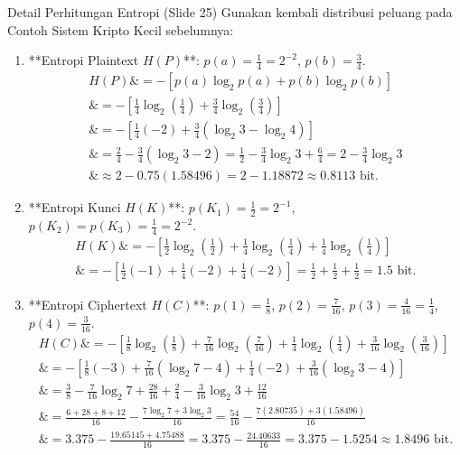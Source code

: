 \documentclass[11pt,a4paper]{article}
\begin{document}
\begin{examplebox}{Detail Perhitungan Entropi (Slide 25)}
Gunakan kembali distribusi peluang pada Contoh Sistem Kripto Kecil sebelumnya:
\begin{enumerate}
    \item **Entropi Plaintext $H(P)$**:
    $p(a) = \frac{1}{4} = 2^{-2}$, $p(b) = \frac{3}{4}$.
    \begin{align*}
    H(P) \&= - \left[ p(a)\log_2 p(a) + p(b)\log_2 p(b) \right] \\
    \&= - \left[ \frac{1}{4}\log_2\left(\frac{1}{4}\right) + \frac{3}{4}\log_2\left(\frac{3}{4}\right) \right] \\
    \&= - \left[ \frac{1}{4}(-2) + \frac{3}{4}(\log_2 3 - \log_2 4) \right] \\
    \&= \frac{2}{4} - \frac{3}{4}(\log_2 3 - 2) = \frac{1}{2} - \frac{3}{4}\log_2 3 + \frac{6}{4} = 2 - \frac{3}{4}\log_2 3 \\
    \&\approx 2 - 0.75(1.58496) = 2 - 1.18872 \approx 0.8113 \text{ bit}.
    \end{align*}
    \item **Entropi Kunci $H(K)$**:
    $p(K_1) = \frac{1}{2} = 2^{-1}$, $p(K_2) = p(K_3) = \frac{1}{4} = 2^{-2}$.
    \begin{align*}
    H(K) \&= - \left[ \frac{1}{2}\log_2\left(\frac{1}{2}\right) + \frac{1}{4}\log_2\left(\frac{1}{4}\right) + \frac{1}{4}\log_2\left(\frac{1}{4}\right) \right] \\
    \&= - \left[ \frac{1}{2}(-1) + \frac{1}{4}(-2) + \frac{1}{4}(-2) \right] = \frac{1}{2} + \frac{1}{2} + \frac{1}{2} = 1.5 \text{ bit}.
    \end{align*}
    \item **Entropi Ciphertext $H(C)$**:
    $p(1) = \frac{1}{8}$, $p(2) = \frac{7}{16}$, $p(3) = \frac{4}{16} = \frac{1}{4}$, $p(4) = \frac{3}{16}$.
    \begin{align*}
    H(C) \&= - \left[ \frac{1}{8}\log_2\left(\frac{1}{8}\right) + \frac{7}{16}\log_2\left(\frac{7}{16}\right) + \frac{1}{4}\log_2\left(\frac{1}{4}\right) + \frac{3}{16}\log_2\left(\frac{3}{16}\right) \right] \\
    \&= - \left[ \frac{1}{8}(-3) + \frac{7}{16}(\log_2 7 - 4) + \frac{1}{4}(-2) + \frac{3}{16}(\log_2 3 - 4) \right] \\
    \&= \frac{3}{8} - \frac{7}{16}\log_2 7 + \frac{28}{16} + \frac{2}{4} - \frac{3}{16}\log_2 3 + \frac{12}{16} \\
    \&= \frac{6 + 28 + 8 + 12}{16} - \frac{7\log_2 7 + 3\log_2 3}{16} = \frac{54}{16} - \frac{7(2.80735) + 3(1.58496)}{16} \\
    \&= 3.375 - \frac{19.65145 + 4.75488}{16} = 3.375 - \frac{24.40633}{16} = 3.375 - 1.5254 \approx 1.8496 \text{ bit}.
    \end{align*}
\end{enumerate}
\end{examplebox}
\end{document}
